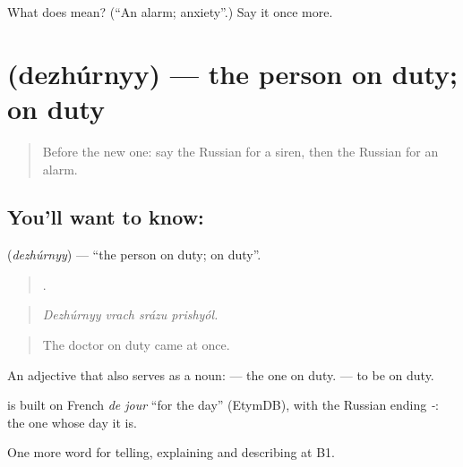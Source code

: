 \begin{tcolorbox}[breakable,colback=teal!4,colframe=teal!35!black,title={Before you move on}]
What does  mean? (\textquotedblleft{}An alarm; anxiety\textquotedblright{}.) Say it once more.
\end{tcolorbox}
\section[\texorpdfstring{\ru{дежурный} (dezhúrnyy)}{дежурный (dezhúrnyy)}]{ (dezhúrnyy) — the person on duty; on duty}

\label{lesson:RU-C299-dezhurnyy}



\begin{quote}
Before the new one: say the Russian for a siren, then the Russian for an alarm.
\end{quote}

\subsection*{You'll want to know: }
\textbf{} (\emph{dezhúrnyy}) — \textquotedblleft{}the person on duty; on duty\textquotedblright{}.

\begin{quote}
   .
\end{quote}

\begin{quote}
\emph{Dezhúrnyy vrach srázu prishyól.}
\end{quote}

\begin{quote}
The doctor on duty came at once.
\end{quote}

An adjective that also serves as a noun: \emph{} — the one on duty. \emph{} — to be on duty.

\begin{cousinweb}
\emph{} is built on French \emph{de jour} \textquotedblleft{}for the day\textquotedblright{} (EtymDB), with the Russian ending \emph{-}: the one whose day it is.
\end{cousinweb}

\begin{grammarlens}[title={What you've built}]
One more word for telling, explaining and describing at B1.
\end{grammarlens}

